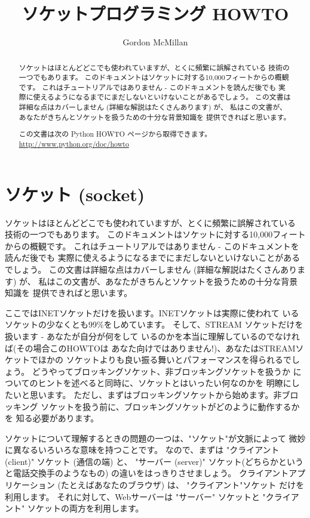 \documentclass{howto}
\title{ソケットプログラミング HOWTO}
\author{Gordon McMillan}
\begin{document}
\maketitle

\begin{abstract}
\noindent
ソケットはほとんどどこでも使われていますが、とくに頻繁に誤解されている
技術の一つでもあります。
このドキュメントはソケットに対する10,000フィートからの概観です。
これはチュートリアルではありません - このドキュメントを読んだ後でも
実際に使えるようになるまでにまだしないといけないことがあるでしょう。
この文書は詳細な点はカバーしません (詳細な解説はたくさんあります) が、
私はこの文書が、あなたがきちんとソケットを扱うための十分な背景知識を
提供できればと思います。


この文書は次の Python HOWTO ページから取得できます。
\url{http://www.python.org/doc/howto}

\end{abstract}

\tableofcontents

\section{ソケット (socket)}

ソケットはほとんどどこでも使われていますが、とくに頻繁に誤解されている
技術の一つでもあります。
このドキュメントはソケットに対する10,000フィートからの概観です。
これはチュートリアルではありません - このドキュメントを読んだ後でも
実際に使えるようになるまでにまだしないといけないことがあるでしょう。
この文書は詳細な点はカバーしません (詳細な解説はたくさんあります) が、
私はこの文書が、あなたがきちんとソケットを扱うための十分な背景知識を
提供できればと思います。

ここではINETソケットだけを扱います。INETソケットは実際に使われて
いるソケットの少なくとも99\%をしめています。
そして、STREAM ソケットだけを扱います - あなたが自分が何をして
いるのかを本当に理解しているのでなければ(その場合このHOWTOは
あなた向けではありません!)、あなたはSTREAMソケットでほかの
ソケットよりも良い振る舞いとパフォーマンスを得られるでしょう。
どうやってブロッキングソケット、非ブロッキングソケットを扱うか
についてのヒントを述べると同時に、ソケットとはいったい何なのかを
明瞭にしたいと思います。
ただし、まずはブロッキングソケットから始めます。非ブロッキング
ソケットを扱う前に、ブロッキングソケットがどのように動作するかを
知る必要があります。

ソケットについて理解するときの問題の一つは、"ソケット"が文脈によって
微妙に異なるいろいろな意味を持つことです。
なので、まずは "クライアント (client)" ソケット (通信の端) と、 
"サーバー (server)" ソケット(どちらかというと電話交換手のようなもの)
の違いをはっきりさせましょう。
クライアントアプリケーション (たとえばあなたのブラウザ) は、
"クライアント"ソケット だけを利用します。
それに対して、Webサーバーは "サーバー" ソケットと "クライアント"
ソケットの両方を利用します。
\end{document}
